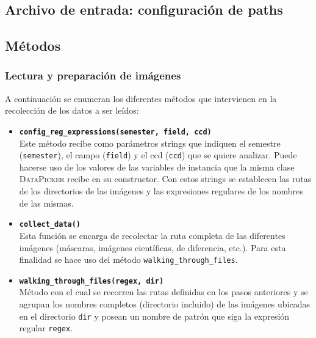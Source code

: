 \begin{appendix}
\subsection{Archivo de entrada: configuraci\'on de paths}
\label{subs:a1}


\subsection{M\'etodos}
\subsubsection{Lectura y preparaci\'on de im\'agenes}
\label{subs:a2}
A continuaci\'on se enumeran los diferentes m\'etodos que intervienen en la recolecci\'on de los datos a ser le\'idos:

\begin{itemize}
\item \textbf{\texttt{config\_reg\_expressions(semester, field, ccd)}}\\
Este m\'etodo recibe como par\'ametros strings que indiquen el semestre (\texttt{semester}), el campo (\texttt{field}) y el ccd (\texttt{ccd}) que se quiere analizar. Puede hacerse uso de los valores de las variables de instancia que la misma clase \textsc{DataPicker} recibe en su constructor. Con estos strings se establecen las rutas de los directorios de las im\'agenes y las expresiones regulares de los nombres de las mismas.
\bigskip

\item \textbf{\texttt{collect\_data()}}\\
Esta funci\'on se encarga de recolectar la ruta completa de las diferentes im\'agenes (m\'ascaras, im\'agenes cient\'ificas, de diferencia, etc.). Para esta finalidad se hace uso del m\'etodo \texttt{walking\_through\_files}. 
\bigskip

\item \textbf{\texttt{walking\_through\_files(regex, dir)}}\\
M\'etodo con el cual se recorren las rutas definidas en los pasos anteriores y se agrupan los nombres completos (directorio incluido) de las im\'agenes ubicadas en el directorio \texttt{dir} y posean un nombre de patr\'on que siga la expresi\'on regular \texttt{regex}.
\bigskip


\end{itemize}
\end{appendix}

